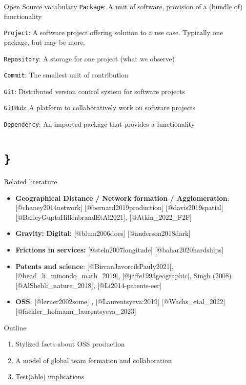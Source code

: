 \documentclass[
  ignorenonframetext,
  aspectratio=169,
]{beamer}
\providecommand{\tightlist}{%
  \setlength{\itemsep}{0pt}\setlength{\parskip}{0pt}}
\begin{document}
\begin{frame}[fragile]{Open Source vocabulary}
\protect\hypertarget{open-source-vocabulary}{}
\texttt{Package}: A unit of software, provision of a (bundle of)
functionality

\texttt{Project}: A software project offering solution to a use case.
Typically one package, but may be more.

\texttt{Repository}: A storage for one project (what we observe)

\texttt{Commit}: The smallest unit of contribution

\texttt{Git}: Distributed version control system for software projects

\texttt{GitHub}: A platform to collaboratively work on software projects

\texttt{Dependency}: An imported package that provides a functionality
\end{frame}

\section{\texorpdfstring{\texttt{\}}}{\}}}\label{section}

\begin{frame}{Related literature}
\protect\hypertarget{related-literature}{}
\begin{itemize}
\tightlist
\item
  \textbf{Geographical Distance / Network formation / Agglomeration}:
  {[}@chaney2014network{]} {[}@bernard2019production{]}
  {[}@davis2019spatial{]} {[}@BaileyGuptaHillenbrandEtAl2021{]},
  {[}@Atkin\_2022\_F2F{]}
\item
  \textbf{Gravity:} \textbf{Digital:} {[}@blum2006does{]}
  {[}@anderson2018dark{]}
\item
  \textbf{Frictions in services:} {[}@stein2007longitude{]}
  {[}@bahar2020hardships{]}
\item
  \textbf{Patents and science}: {[}@BircanJavorcikPauly2021{]},
  {[}@head\_li\_minondo\_math\_2019{]}, {[}@jaffe1993geographic{]},
  Singh (2008) {[}@AlShebli\_nature\_2018{]}, {[}@Li2014-patents-eer{]}
\item
  \textbf{OSS}: {[}@lerner2002some{]} , {[}@Laurentsyeva:2019{]}
  {[}@Wachs\_etal\_2022{]} {[}@fackler\_hofmann\_laurentsyeva\_2023{]}
\end{itemize}
\end{frame}

\begin{frame}{Outline}
\protect\hypertarget{outline}{}
\begin{enumerate}
\tightlist
\item
  Stylized facts about OSS production
\item
  A model of global team formation and collaboration
\item
  Test(able) implications
\end{enumerate}
\end{frame}
\end{document}
